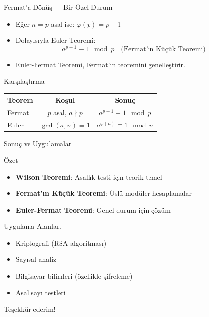 \documentclass{beamer}
\begin{document}
\begin{frame}{Fermat'a Dönüş — Bir Özel Durum}
  \begin{itemize}
    \item Eğer $n = p$ asal ise: $\varphi(p) = p - 1$
    \item Dolayısıyla Euler Teoremi:
    \[
      a^{p - 1} \equiv 1 \mod p \quad \text{(Fermat'ın Küçük Teoremi)}
    \]
    \item Euler-Fermat Teoremi, Fermat'ın teoremini genelleştirir.
  \end{itemize}
  
  \begin{block}{Karşılaştırma}
    \begin{center}
      \begin{tabular}{|l|c|c|}
        \hline
        \textbf{Teorem} & \textbf{Koşul} & \textbf{Sonuç} \\
        \hline
        Fermat & $p$ asal, $a \nmid p$ & $a^{p-1} \equiv 1 \mod p$ \\
        \hline
        Euler & $\gcd(a,n)=1$ & $a^{\varphi(n)} \equiv 1 \mod n$ \\
        \hline
      \end{tabular}
    \end{center}
  \end{block}
\end{frame}

\begin{frame}{Sonuç ve Uygulamalar}
  \begin{block}{Özet}
    \begin{itemize}
      \item \textbf{Wilson Teoremi}: Asallık testi için teorik temel
      \item \textbf{Fermat'ın Küçük Teoremi}: Üslü modüler hesaplamalar
      \item \textbf{Euler-Fermat Teoremi}: Genel durum için çözüm
    \end{itemize}
  \end{block}
  
  \begin{block}{Uygulama Alanları}
    \begin{itemize}
      \item Kriptografi (RSA algoritması)
      \item Sayısal analiz
      \item Bilgisayar bilimleri (özellikle şifreleme)
      \item Asal sayı testleri
    \end{itemize}
  \end{block}
  
  \begin{center}
    \Large \color{deepblue} Teşekkür ederim! \\[0.5cm]
  \end{center}
\end{frame}
\end{document}
